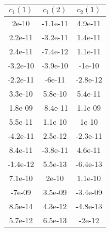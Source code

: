 \begin{tiny}\begin{tabular}{|c|c|c|}
\hline
\textbf{$c_1(1)$}&\textbf{$c_1(2)$}&\textbf{$c_2(1)$}\\\hline
2e-10&-1.1e-11&4.9e-11\\\hline
2.2e-11&-3.2e-11&1.4e-11\\\hline
2.4e-11&-7.4e-12&1.1e-11\\\hline
-3.2e-10&-3.9e-10&-1e-10\\\hline
-2.2e-11&-6e-11&-2.8e-12\\\hline
3.3e-10&5.8e-10&5.4e-11\\\hline
1.8e-09&-8.4e-11&1.1e-09\\\hline
5.5e-11&1.1e-10&1e-10\\\hline
-4.2e-11&2.5e-12&-2.3e-11\\\hline
8.4e-11&-3.8e-11&4.6e-11\\\hline
-1.4e-12&5.5e-13&-6.4e-13\\\hline
7.1e-10&2e-10&1.1e-10\\\hline
-7e-09&3.5e-09&-3.4e-09\\\hline
8.5e-14&4.3e-12&-4.8e-13\\\hline
5.7e-12&6.5e-13&-2e-12\\\hline
\end{tabular}
\end{tiny}